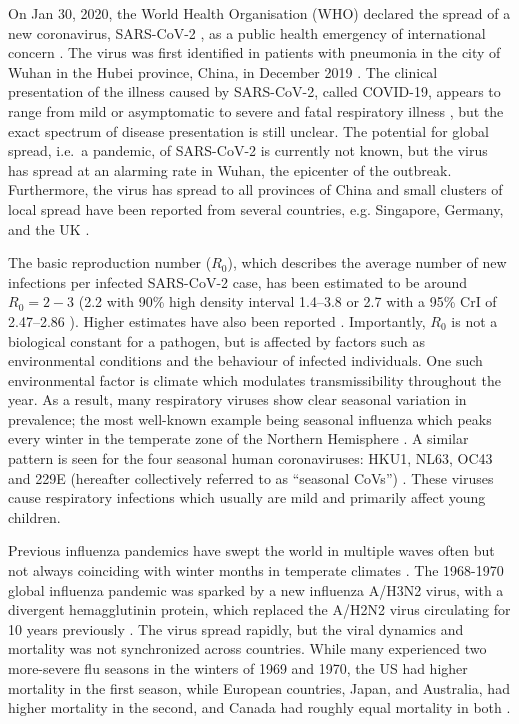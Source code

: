 \documentclass[rmp, reprint, superscriptaddress, floatfix,amsmath]{revtex4-1}
\begin{document}
On Jan 30, 2020, the World Health Organisation (WHO) declared the spread of a new coronavirus, SARS-CoV-2 \citep{ICTV_SARS-CoV-2}, as a public health emergency of international concern \citep{WHO_statement}.
The virus was first identified in patients with pneumonia in the city of Wuhan in the Hubei province, China, in December 2019 \citep{Liangjun2020rna}.
The clinical presentation of the illness caused by SARS-CoV-2, called COVID-19, appears to range from mild or asymptomatic to severe and fatal respiratory illness \citep{WHO_situation_report23}, but the exact spectrum of disease presentation is still unclear. 
The potential for global spread, i.e.~a pandemic, of SARS-CoV-2 is currently not known, but the virus has spread at an alarming rate in Wuhan, the epicenter of the outbreak. Furthermore, the virus has spread to all provinces of China and small clusters of local spread have been reported from several countries, e.g. Singapore, Germany, and the UK \citep{WHO_situation_report23, rothe2020transmission, MOH_Singapore}. 

The basic reproduction number ($R_0$), which describes the average number of new infections per infected SARS-CoV-2 case, has been estimated to be around $R_0 = 2 - 3$ (2.2  with 90\% high density interval 1.4–3.8 \citep{Riou2020pattern} or 2.7 with a 95\% CrI of 2.47–2.86 \citep{wu_nowcasting_2020}).
Higher estimates have also been reported \citep{yang_epidemiological_2020,sanche_novel_2020}. Importantly, $R_0$ is not a biological constant for a pathogen, but is affected by factors such as environmental conditions and the behaviour of infected individuals. One such environmental factor is climate which modulates transmissibility throughout the year. 
As a result, many respiratory viruses show clear seasonal variation in prevalence; the most well-known example being seasonal influenza which peaks every winter in the temperate zone of the Northern Hemisphere \citep{petrova_evolution_2018}. 
A similar pattern is seen for the four seasonal human coronaviruses: HKU1, NL63, OC43 and 229E (hereafter collectively referred to as ``seasonal CoVs'') \citep{killerby2018human,goes2019typical,galanti2019longitudinal,friedman2018human,al2016diversity,huang2017epidemiology}. 
These viruses cause respiratory infections which usually are mild and primarily affect young children. 
         
Previous influenza pandemics have swept the world in multiple waves often but not always coinciding with winter months in temperate climates \citep{taubenberger_1918_2019,viboud_multinational_2005,viboud_global_2016,amato-gauci_surveillance_2011}. 
The 1968-1970 global influenza pandemic was sparked by a new influenza A/H3N2 virus, with a divergent hemagglutinin protein, which replaced the A/H2N2 virus circulating for 10 years previously \citep{viboud_multinational_2005}. The virus spread rapidly, but the viral dynamics and mortality was not synchronized across countries.
While many experienced two more-severe flu seasons in the winters of 1969 and 1970, the US had higher mortality in the first season, while European countries, Japan, and Australia, had higher mortality in the second, and Canada had roughly equal mortality in both \citep{viboud_multinational_2005}.
\end{document}

